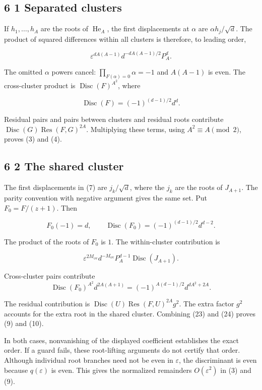\documentclass[
  11pt,
]{article}
\begin{document}
\subsection{6 1 Separated clusters}\label{separated-clusters}

If \(h_1,\ldots,h_A\) are the roots of \(\operatorname{He}_A\), the
first displacements at \(\alpha\) are \(\alpha h_j/\sqrt d\). The
product of squared differences within all clusters is therefore, to
leading order,

\[
\varepsilon^{dA(A-1)}d^{-dA(A-1)/2}P_A^d. \tag{21}
\]

The omitted \(\alpha\) powers cancel: \(\prod_{F(\alpha)=0}\alpha=-1\)
and \(A(A-1)\) is even. The cross-cluster product is
\(\operatorname{Disc}(F)^{A^2}\), where

\[
\operatorname{Disc}(F)=(-1)^{(d-1)/2}d^d. \tag{22}
\]

Residual pairs and pairs between clusters and residual roots contribute
\(\operatorname{Disc}(G)\operatorname{Res}(F,G)^{2A}\). Multiplying
these terms, using \(A^2\equiv A\pmod2\), proves (3) and (4).

\subsection{6 2 The shared cluster}\label{the-shared-cluster}

The first displacements in (7) are \(j_k/\sqrt d\), where the \(j_k\)
are the roots of \(J_{A+1}\). The parity convention with negative
argument gives the same set. Put \(F_0=F/(z+1)\). Then

\[
F_0(-1)=d,\qquad
\operatorname{Disc}(F_0)=(-1)^{(d-1)/2}d^{d-2}.
\]

The product of the roots of \(F_0\) is \(1\). The within-cluster
contribution is

\[
\varepsilon^{2M_{\mathrm{ov}}}d^{-M_{\mathrm{ov}}}
P_A^{d-1}\operatorname{Disc}(J_{A+1}). \tag{23}
\]

Cross-cluster pairs contribute
\nopagebreak[4]
\[
\operatorname{Disc}(F_0)^{A^2}d^{2A(A+1)}
=(-1)^{A(d-1)/2}d^{dA^2+2A}. \tag{24}
\]

The residual contribution is
\(\operatorname{Disc}(U)\operatorname{Res}(F,U)^{2A}g^2\). The extra
factor \(g^2\) accounts for the extra root in the shared cluster.
Combining (23) and (24) proves (9) and (10).

In both cases, nonvanishing of the displayed coefficient establishes the
exact order. If a guard fails, these root-lifting arguments do not
certify that order. Although individual root branches need not be even
in \(\varepsilon\), the discriminant is even because \(q(\varepsilon)\)
is even. This gives the normalized remainders \(O(\varepsilon^2)\) in
(3) and (9).
\end{document}
